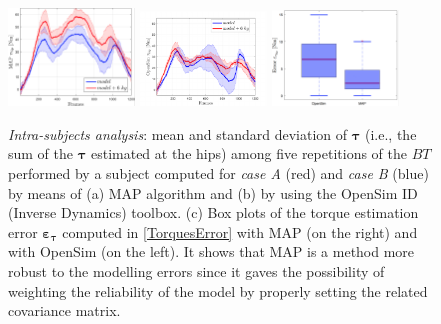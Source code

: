  \begin{figure}[!ht]
	 \centering
		\includegraphics[width=0.3\textwidth]{figs/TorqueComparison}
 		\includegraphics[width=0.3\textwidth]{figs/TorqueComparisonOPENSIM.pdf}
  		\includegraphics[width=0.3\textwidth]{figs/OPENSIMvsMAP}
     \caption{\emph{Intra-subjects analysis}: mean and standard deviation of $\bm \tau$
	  (i.e., the sum of the $\bm \tau$ estimated at the hips)
	 among five repetitions of the $BT$ performed by a subject computed for \emph{case A} 
	 (red) and \emph{case B} (blue) by means of (a) MAP algorithm  and (b) by using the 
	 OpenSim ID (Inverse Dynamics) toolbox. (c) Box plots of the torque estimation error
	 $\bm{\varepsilon}_{\bm{\tau}}$ computed in \eqref{TorquesError} with MAP (on the right)
	 and with OpenSim (on the left). It shows that MAP is a method more robust to the
	 modelling errors since it gaves the possibility of weighting the reliability of the model
	  by properly setting the related covariance matrix. }
 \end{figure}

